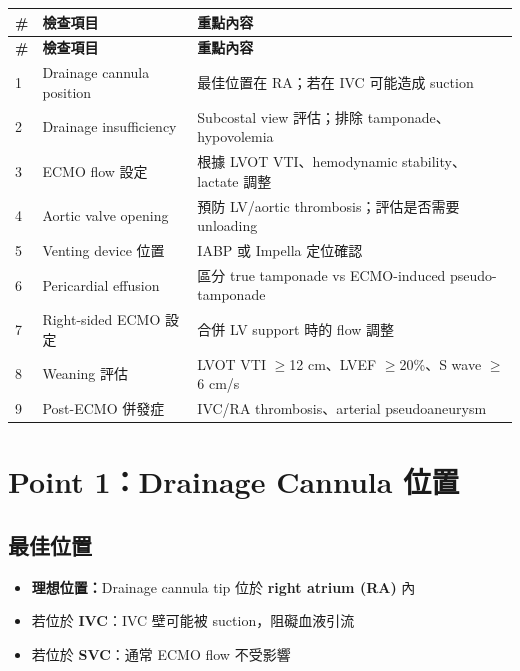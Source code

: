 \documentclass[12pt,a4paper]{article}
\begin{document}
\begin{longtable}{p{0.5cm}p{4cm}p{9.5cm}}
\toprule
\textbf{\#} & \textbf{檢查項目} & \textbf{重點內容} \\
\midrule
\endfirsthead

\toprule
\textbf{\#} & \textbf{檢查項目} & \textbf{重點內容} \\
\midrule
\endhead

\bottomrule
\endfoot

1 & Drainage cannula position & 最佳位置在 RA；若在 IVC 可能造成 suction \\
\midrule
2 & Drainage insufficiency & Subcostal view 評估；排除 tamponade、hypovolemia \\
\midrule
3 & ECMO flow 設定 & 根據 LVOT VTI、hemodynamic stability、lactate 調整 \\
\midrule
4 & Aortic valve opening & 預防 LV/aortic thrombosis；評估是否需要 unloading \\
\midrule
5 & Venting device 位置 & IABP 或 Impella 定位確認 \\
\midrule
6 & Pericardial effusion & 區分 true tamponade vs ECMO-induced pseudo-tamponade \\
\midrule
7 & Right-sided ECMO 設定 & 合併 LV support 時的 flow 調整 \\
\midrule
8 & Weaning 評估 & LVOT VTI $\geq$12 cm、LVEF $\geq$20\%、S wave $\geq$6 cm/s \\
\midrule
9 & Post-ECMO 併發症 & IVC/RA thrombosis、arterial pseudoaneurysm \\
\bottomrule
\end{longtable}

\section{Point 1：Drainage Cannula 位置}

\subsection{最佳位置}

\begin{itemize}
    \item \textbf{理想位置：}Drainage cannula tip 位於 \textbf{right atrium (RA)} 內
    \item 若位於 \textbf{IVC}：IVC 壁可能被 suction，阻礙血液引流
    \item 若位於 \textbf{SVC}：通常 ECMO flow 不受影響
\end{itemize}
\end{document}
